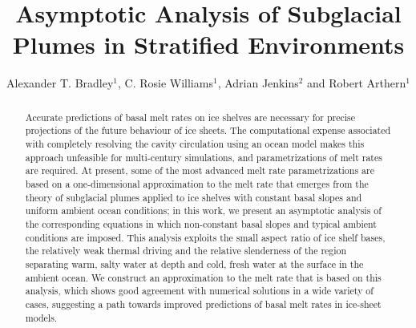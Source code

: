\documentclass[openacc]{rsproca_new}%
\begin{document}
\title{Asymptotic Analysis of Subglacial Plumes in Stratified Environments}

\author{%
Alexander T. Bradley$^{1}$, C. Rosie Williams$^{1}$, Adrian Jenkins$^{2}$ and Robert Arthern$^{1}$}

\address{$^{1}$British Antarctic Survey, Cambridge, UK\\
$^{2}$Department of Geography and Environmental Sciences, Northumbria University, Newcastle upon Tyne, UK.}

\subject{Oceanography, Glaciology, Mathematical Modelling}



\begin{abstract}
Accurate predictions of basal melt rates on ice shelves are necessary for precise projections of the future behaviour of ice sheets. The computational expense associated with completely resolving the cavity circulation using an ocean model makes this approach unfeasible for multi-century simulations, and parametrizations of melt rates are required. At present, some of the most advanced melt rate parametrizations are based on a one-dimensional approximation to the melt rate that emerges from the theory of subglacial plumes applied to ice shelves with constant basal slopes and uniform ambient ocean conditions; in this work, we present an asymptotic analysis of the corresponding equations in which non-constant basal slopes and typical ambient conditions are imposed. This analysis exploits the small aspect ratio of ice shelf bases, the relatively weak thermal driving and the relative slenderness of the region separating warm, salty water at depth and cold, fresh water at the surface in the ambient ocean. We construct an approximation to the melt rate that is based on this analysis, which shows good agreement with numerical solutions in a wide variety of cases, suggesting a path towards improved predictions of basal melt rates in ice-sheet models.
\end{abstract}

\end{document}
